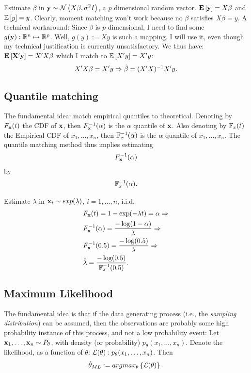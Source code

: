 \begin{example}

Estimate $\beta$ in $\mathbf{y} \sim \mathcal{N}\left(X\beta,\sigma^2 I\right)$, a $p$ dimensional random vector.
$\mathbf{E}\left[ \mathbf{y} \right]=X\beta$ and $\mathbb{E}\left[y\right]=y$.
Clearly, moment matching won't work because no $\beta$ satisfies $X\beta=y$.
A technical workaround:
Since $\beta$ is $p$ dimensional, I need to find some $g(\mathbf{y}): \mathbb{R}^n \mapsto \mathbb{R}^p$.
Well, $g(y):=Xy$ is such a mapping. I will use it, even though my technical justification is currently unsatisfactory. We thus have:
$\mathbf{E}\left[ \mathbf{X'y} \right]=X'X\beta$ which I match to $\mathbb{E}\left[X'y\right]=X'y$:
$$
  X'X \beta = X' y \Rightarrow \hat{\mathbf{\beta}}=(X'X)^{-1} X'y.
$$

\end{example}


\subsection{Quantile matching}
\label{sec:quantiles}

The fundamental idea: match empirical quantiles to theoretical. 
Denoting by $F_{\mathbf{x}} (t)$ the CDF of $\mathbf{x}$, then $F_{\mathbf{x}}^{-1} (\alpha)$ is the $\alpha$ quantile of $\mathbf{x}$.
Also denoting by $\mathbb{F}_{x}(t)$ the Empirical CDF of $x_1,\dots, x_n$, then $\mathbb{F}^{-1}_{x}(\alpha)$ is the $\alpha$ quantile of $x_1,\dots, x_n$.
The quantile matching method thus implies estimating
$$ F_{\mathbf{x}}^{-1} (\alpha) $$
by 
$$ \mathbb{F}^{-1}_{x}(\alpha)  . $$

\begin{example}
Estimate $\lambda$ in $\mathbf{x}_i \sim exp(\lambda)$, $i=1,\dots,n$, i.i.d.
\begin{align*}
	& F_{\mathbf{x}} (t) = 1-\exp(-\lambda t) = \alpha \Rightarrow \\
	& F_{\mathbf{x}}^{-1} (\alpha) = \frac{-\log(1-\alpha)}{\lambda} \Rightarrow \\
	& F_{\mathbf{x}}^{-1} (0.5) = \frac{-\log(0.5)}{\lambda} \Rightarrow \\
	& \hat{\mathbf{\lambda}} = \frac{-\log(0.5)}{\mathbb{F}^{-1}_{x}(0.5)}.
\end{align*}

\end{example}


\subsection{Maximum Likelihood}
\label{sec:ml}

The fundamental idea is that if the data generating process (i.e., the \emph{sampling distribution}) can be assumed, then the observations are probably some high probability instance of this process, and not a low probability event:
Let $\mathbf{x}_1,\dots,\mathbf{x}_n \sim P_\theta$, with density (or probability) $p_\theta(x_1,\dots,x_n)$.
Denote the likelihood, as a function of $\theta$: $\mathcal{L}(\theta): p_\theta(x_1,\dots,x_n)$.
Then $$\hat{\mathbf{\theta}}_{ML}:= argmax_{\theta}\left\{  \mathcal{L}(\theta)  \right\}.$$

